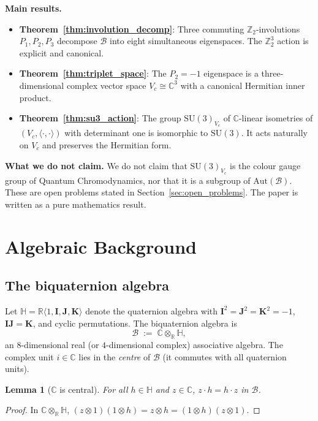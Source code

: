 \documentclass[12pt,a4paper]{article}
\newtheorem{lemma}[theorem]{Lemma}
\theoremstyle{remark}
\newcommand{\B}{\mathcal{B}}          %
\newcommand{\C}{\mathbb{C}}
\newcommand{\R}{\mathbb{R}}
\newcommand{\H}{\mathbb{H}}
\begin{document}
\medskip
\noindent\textbf{Main results.}
\begin{itemize}
\item \textbf{Theorem~\ref{thm:involution_decomp}}: Three commuting
  $\mathbb{Z}_2$-involutions $P_1,P_2,P_3$ decompose $\B$ into eight
  simultaneous eigenspaces.  The $\mathbb{Z}_2^3$ action is explicit and
  canonical.
\item \textbf{Theorem~\ref{thm:triplet_space}}: The $P_2=-1$ eigenspace is a
  three-dimensional complex vector space $V_c \cong \C^3$ with a canonical
  Hermitian inner product.
\item \textbf{Theorem~\ref{thm:su3_action}}: The group $\mathrm{SU}(3)_{V_c}$
  of $\C$-linear isometries of $(V_c,\langle\cdot,\cdot\rangle)$ with
  determinant one is isomorphic to $\mathrm{SU}(3)$.  It acts naturally on
  $V_c$ and preserves the Hermitian form.
\end{itemize}

\medskip
\noindent\textbf{What we do not claim.}
We do not claim that $\mathrm{SU}(3)_{V_c}$ is the colour gauge group of
Quantum Chromodynamics, nor that it is a subgroup of $\mathrm{Aut}(\B)$.
These are open problems stated in Section~\ref{sec:open_problems}.  The paper
is written as a pure mathematics result.

\section{Algebraic Background}
\label{sec:background}

\subsection{The biquaternion algebra}

Let $\H = \R\langle 1,\mathbf{I},\mathbf{J},\mathbf{K}\rangle$ denote the
quaternion algebra with $\mathbf{I}^2=\mathbf{J}^2=\mathbf{K}^2=-1$,
$\mathbf{I}\mathbf{J}=\mathbf{K}$, and cyclic permutations.  The biquaternion
algebra is
\[
  \B \;:=\; \C \otimes_\R \H,
\]
an $8$-dimensional real (or $4$-dimensional complex) associative algebra.
The complex unit $i\in\C$ lies in the \emph{centre} of $\B$ (it commutes with
all quaternion units).

\begin{lemma}[$\C$ is central]
  \label{lem:C_central}
  For all $h\in\H$ and $z\in\C$, $z\cdot h = h\cdot z$ in $\B$.
\end{lemma}
\begin{proof}
  In $\C\otimes_\R\H$, $(z\otimes 1)(1\otimes h) = z\otimes h
  = (1\otimes h)(z\otimes 1)$.
\end{proof}
\end{document}
